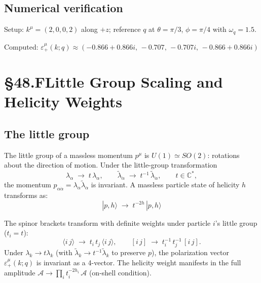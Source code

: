 \subsection{Numerical verification}

Setup: $k^\mu=(2,0,0,2)$ along $+z$;
reference $q$ at $\theta=\pi/3$, $\phi=\pi/4$ with $\omega_q=1.5$.

Computed: $\varepsilon_+^\mu(k;q) \approx (-0.866+0.866i,\,-0.707,\,-0.707i,\,-0.866+0.866i)$


\section{§48.F\quad Little Group Scaling and Helicity Weights}

\subsection{The little group}

The little group of a massless momentum $p^\mu$ is $U(1)\simeq SO(2)$:
rotations about the direction of motion.  Under the little-group transformation
\begin{equation}
  \lambda_\alpha \;\to\; t\,\lambda_\alpha,
  \qquad
  \tilde\lambda_{\dot\alpha} \;\to\; t^{-1}\,\tilde\lambda_{\dot\alpha},
  \qquad t\in\mathbb{C}^*,
  \tag{48.15}
\end{equation}
the momentum $p_{\alpha\dot\alpha}=\lambda_\alpha\tilde\lambda_{\dot\alpha}$ is
invariant.  A massless particle state of helicity $h$ transforms as:
\begin{equation}
  |p,h\rangle \;\to\; t^{-2h}\,|p,h\rangle
  \tag{48.16}
\end{equation}

The spinor brackets transform with definite weights under particle $i$'s little group ($t_i=t$):
\begin{equation}
  \langle i\,j\rangle \;\to\; t_i\,t_j\,\langle i\,j\rangle,
  \qquad
  [i\,j] \;\to\; t_i^{-1}\,t_j^{-1}\,[i\,j].
  \tag{48.17}
\end{equation}
Under $\lambda_k\to t\lambda_k$ (with $\tilde\lambda_k\to t^{-1}\tilde\lambda_k$ to
preserve $p$), the polarization vector $\varepsilon_+^\mu(k;q)$ is invariant as a
4-vector.  The helicity weight manifests in the full amplitude
$\mathcal{A} \to \prod_i t_i^{-2h_i}\,\mathcal{A}$ (on-shell condition).


